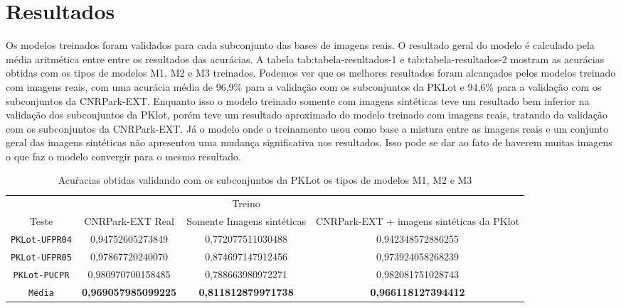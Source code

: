 \section{Resultados}

Os modelos treinados foram validados para cada subconjunto das bases de imagens reais. O resultado geral do modelo é calculado pela média aritmética entre entre os resultados das acurácias. A tabela {tab:tabela-resultados-1} e {tab:tabela-resultados-2} mostram as acurácias obtidas com os tipos de modelos M1, M2 e M3 treinados. Podemos ver que os melhores resultados foram alcançados pelos modelos treinado com imagens reais, com uma acurácia média de 96,9\% para a validação com os subconjuntos da PKLot e 94,6\% para a validação com os subconjuntos da CNRPark-EXT. Enquanto isso o modelo treinado somente com imagens sintéticas teve um resultado bem inferior na validação dos subconjuntos da PKlot, porém teve um resultado aproximado do modelo treinado com imagens reais, tratando da validação com os subconjuntos da CNRPark-EXT. Já o modelo onde o treinamento usou como base a mistura entre as imagens reais e um conjunto geral das imagens sintéticas não apresentou uma mudança significativa nos resultados. Isso pode se dar ao fato de haverem muitas imagens o que faz o modelo convergir para o mesmo resultado.

\begin{table}[!htp] \footnotesize
    \centering
    \caption{Acuŕacias obtidas validando com os subconjuntos da PKLot os tipos de modelos M1, M2 e M3}
    \label{tab:tabela-resultados-1}
    \begin{tabular}{cccc}
    \texttt{} &  & Treino &  \\
    \cline{2-4}
    \multicolumn{1}{c|}{Teste}& CNRPark-EXT Real & Somente Imagens sintéticas & CNRPark-EXT + imagens sintéticas da PKlot \\
    \hline
    \texttt{PKLot-UFPR04} & 0,94752605273849 & 0,772077511030488 & 0,942348572886255 \\
    \hline
    \texttt{PKLot-UFPR05} & 0,97867720240070 & 0,874697147912456 & 0,973924058268239 \\
    \hline
    \texttt{PKLot-PUCPR} & 0,980970700158485 & 0,788663980972271 & 0,982081751028743 \\
    \hline
    \texttt{Média} & \textbf{0,969057985099225} & \textbf{0,811812879971738} & \textbf{0,966118127394412} \\
    \hline
    \end{tabular}
\end{table}

